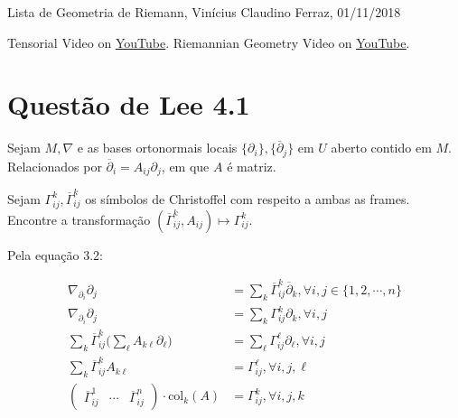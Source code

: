 \documentclass[10pt,a4paper]{article}
\begin{document}
	\Large

	\begin{center}
		Lista de Geometria de Riemann, Vin\'icius Claudino Ferraz, 01/11/2018
	\end{center}

	\normalsize

Tensorial Video on \href{https://www.youtube.com/watch?v=mmzqmIcX7xo}{\color{blue}\underline{YouTube}}. Riemannian Geometry Video on \href{https://www.youtube.com/watch?v=Z3IXeWvEEa4}{\color{blue}\underline{YouTube}}.

	\section{Quest\~ao de Lee 4.1}
		\begin{flushright}
		\end{flushright}

		Sejam $M, \nabla$ e as bases ortonormais locais $\{ \partial_i \}, \{ \overline{\partial}_j \}$ em $U$ aberto contido em $M$. Relacionados por $\overline{\partial}_i = A_{ij} \partial_j$, em que $A$ \'e matriz.

		Sejam $\Gamma_{ij}^k, \overline{\Gamma}_{ij}^k$ os s\'imbolos de Christoffel com respeito a ambas as frames. Encontre a transforma\c{c}\~ao $(\overline{\Gamma}_{ij}^k, A_{ij}) \mapsto \Gamma_{ij}^k$.

		\vspace{12mm}

		Pela equa\c{c}\~ao 3.2:

		\begin{align*}
  		\nabla_{\partial_i} \partial_j &= \sum_k \overline{\Gamma}_{ij}^k \overline{\partial}_k, \forall i, j \in \{ 1, 2, \cdots, n \} \\
  		\nabla_{\partial_i} \partial_j &= \sum_k \Gamma_{ij}^k \partial_k, \forall i, j \\
		\sum_k \overline{\Gamma}_{ij}^k \bigg(\sum_\ell A_{k\ell} \partial_\ell \bigg) &= \sum_\ell \Gamma_{ij}^\ell \partial_\ell, \forall i, j \\
		\sum_k \overline{\Gamma}_{ij}^k A_{k\ell} &= \Gamma_{ij}^\ell, \forall i, j, \ell \\
		\left(\begin{matrix} \overline{\Gamma}_{ij}^1 & \cdots & \overline{\Gamma}_{ij}^n \end{matrix}\right) \cdot \text{col}_k(A) &= \Gamma_{ij}^k, \forall i, j, k
		\end{align*}
\end{document}
